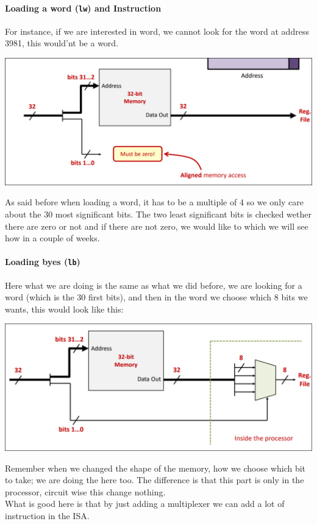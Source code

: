 \paragraph{Loading a word (\texttt{lw}) and Instruction}%
For instance, if we are interested in word, we cannot look for the word at address 3981, this would'nt be a word.
\begin{center}
\includegraphics[scale=0.25]{screenshots/2025-10-12_11.png}
\end{center}
As said before when loading a word, it has to be a multiple of 4 so we only care about the 30 most significant bits. The two least significant bits is checked wether there are zero or not and if there are not zero, we would like to  which we will see how in a couple of weeks.

\paragraph{Loading byes (\texttt{lb})}%
Here what we are doing is the same as what we did before, we are looking for a word (which is the 30 first bits), and then in the word we choose which 8 bits we wants, this would look like this:
\begin{center}
\includegraphics[scale=0.25]{screenshots/2025-10-12_12.png}
\end{center}

Remember when we changed the shape of the memory, how we choose which bit to take; we are doing  the  here too. The difference is that this part is only in the processor, circuit wise this change nothing.\\
What is good here is that by just adding a multiplexer we can add a lot of instruction in the ISA.
